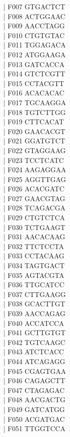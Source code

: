 \documentclass[titlepage,10pt,a4paper,uplatex]{jsbook}
\newenvironment{content}{\begin{shaded}\vspace{-1em}\raggedright\ttfamily\footnotesize\setlength{\baselineskip}{1.4em}}{\end{shaded}\vspace{-1em}}
\begin{document}
\begin{content}
| F007	GTGACTCT\\
| F008	ACTGGAAC\\
| F009	AACCTAGG\\
| F010	CTGTGTAC\\
| F011	TGGAGACA\\
| F012	ATGGAAGA\\
| F013	GATCACCA\\
| F014	GTCTCGTT\\
| F015	CCTACGTT\\
| F016	ACACACAC\\
| F017	TGCAAGGA\\
| F018	TGTCTTGG\\
| F019	CTTCACAT\\
| F020	GAACACGT\\
| F021	GGATGTCT\\
| F022	GTAGGAAG\\
| F023	TCCTCATC\\
| F024	AAGAGGAA\\
| F025	AGGTTGAG\\
| F026	ACACGATC\\
| F027	GAACGTAG\\
| F028	TCAGACGA\\
| F029	CTGTCTCA\\
| F030	TCTGAAGT\\
| F031	AACACAAG\\
| F032	TTCTCCTA\\
| F033	CCTACAAG\\
| F034	TAGTGACT\\
| F035	AGTACGTA\\
| F036	TTGCATCC\\
| F037	CTTGAAGG\\
| F038	GCACTTGT\\
| F039	AACCAGAG\\
| F040	ACCATCCA\\
| F041	GCTTGTGT\\
| F042	TGTCAAGC\\
| F043	ATCTCACC\\
| F044	ATCAGAGG\\
| F045	CGAGTGAA\\
| F046	CAGAGCTT\\
| F047	CTAGAGAC\\
| F048	AACGACTG\\
| F049	GATCATGG\\
| F050	ACGATGAC\\
| F051	TTGGTCCA\\

\end{content}
\end{document}
